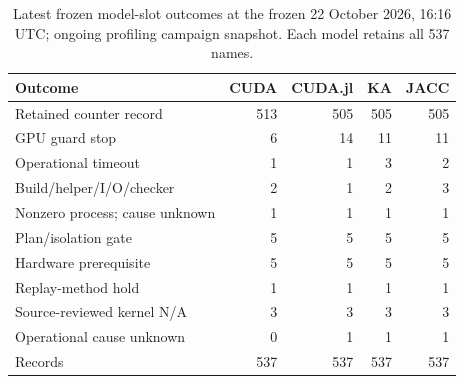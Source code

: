 \begin{table}[t]
\centering\small
\caption{Latest frozen model-slot outcomes at the frozen 22 October 2026, 16:16 UTC; ongoing profiling campaign snapshot. Each model retains all 537 names.}
\label{tab:roofline-failures-latest}
\begin{tabular}{lrrrr}
\toprule
Outcome & CUDA & CUDA.jl & KA & JACC \\
\midrule
Retained counter record & 513 & 505 & 505 & 505 \\
GPU guard stop & 6 & 14 & 11 & 11 \\
Operational timeout & 1 & 1 & 3 & 2 \\
Build/helper/I/O/checker & 2 & 1 & 2 & 3 \\
Nonzero process; cause unknown & 1 & 1 & 1 & 1 \\
Plan/isolation gate & 5 & 5 & 5 & 5 \\
Hardware prerequisite & 5 & 5 & 5 & 5 \\
Replay-method hold & 1 & 1 & 1 & 1 \\
Source-reviewed kernel N/A & 3 & 3 & 3 & 3 \\
Operational cause unknown & 0 & 1 & 1 & 1 \\
\midrule
Records & 537 & 537 & 537 & 537 \\
\bottomrule
\end{tabular}
\end{table}
